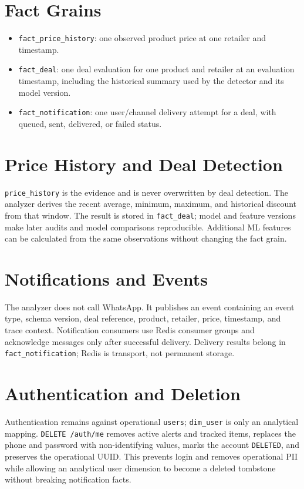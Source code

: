 \documentclass[11pt]{article}
\begin{document}
\section{Fact Grains}
\begin{itemize}
  \item \texttt{fact\_price\_history}: one observed product price at one
    retailer and timestamp.
  \item \texttt{fact\_deal}: one deal evaluation for one product and retailer
    at an evaluation timestamp, including the historical summary used by the
    detector and its model version.
  \item \texttt{fact\_notification}: one user/channel delivery attempt for a
    deal, with queued, sent, delivered, or failed status.
\end{itemize}

\section{Price History and Deal Detection}
\texttt{price\_history} is the evidence and is never overwritten by deal
detection. The analyzer derives the recent average, minimum, maximum, and
historical discount from that window. The result is stored in
\texttt{fact\_deal}; model and feature versions make later audits and model
comparisons reproducible. Additional ML features can be calculated from the
same observations without changing the fact grain.

\section{Notifications and Events}
The analyzer does not call WhatsApp. It publishes an event containing an event
type, schema version, deal reference, product, retailer, price, timestamp, and
trace context. Notification consumers use Redis consumer groups and acknowledge
messages only after successful delivery. Delivery results belong in
\texttt{fact\_notification}; Redis is transport, not permanent storage.

\section{Authentication and Deletion}
Authentication remains against operational \texttt{users}; \texttt{dim\_user}
is only an analytical mapping. \texttt{DELETE /auth/me} removes active alerts
and tracked items, replaces the phone and password with non-identifying values,
marks the account \texttt{DELETED}, and preserves the operational UUID. This
prevents login and removes operational PII while allowing an analytical user
dimension to become a deleted tombstone without breaking notification facts.
\end{document}
